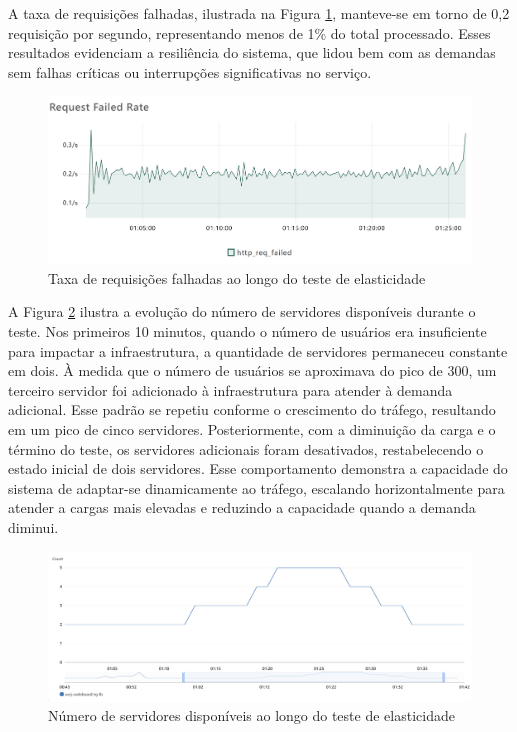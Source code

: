 A taxa de requisições falhadas, ilustrada na Figura \ref{fig:elasticity-req-failed-rate}, manteve-se em torno de 0,2 requisição por segundo, representando menos de 1\% do total processado. Esses resultados evidenciam a resiliência do sistema, que lidou bem com as demandas sem falhas críticas ou interrupções significativas no serviço.

\begin{figure}[H]
    \centering
    \includegraphics[width=1\textwidth]{assets/elasticity-test/req-failed-rate.png}
    \caption{Taxa de requisições falhadas ao longo do teste de elasticidade}
    \label{fig:elasticity-req-failed-rate}
\end{figure}

A Figura \ref{fig:elasticity-healthy-hosts} ilustra a evolução do número de servidores disponíveis durante o teste. Nos primeiros 10 minutos, quando o número de usuários era insuficiente para impactar a infraestrutura, a quantidade de servidores permaneceu constante em dois. À medida que o número de usuários se aproximava do pico de 300, um terceiro servidor foi adicionado à infraestrutura para atender à demanda adicional. Esse padrão se repetiu conforme o crescimento do tráfego, resultando em um pico de cinco servidores. Posteriormente, com a diminuição da carga e o término do teste, os servidores adicionais foram desativados, restabelecendo o estado inicial de dois servidores. Esse comportamento demonstra a capacidade do sistema de adaptar-se dinamicamente ao tráfego, escalando horizontalmente para atender a cargas mais elevadas e reduzindo a capacidade quando a demanda diminui.

\begin{figure}[H]
    \centering
    \includegraphics[width=1\textwidth]{assets/elasticity-test/healthy-hosts.png}
    \caption{Número de servidores disponíveis ao longo do teste de elasticidade}
    \label{fig:elasticity-healthy-hosts}
\end{figure}

